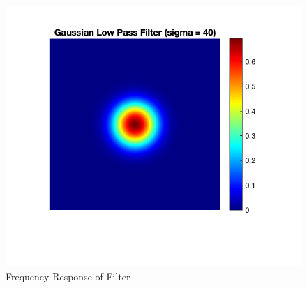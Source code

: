 \documentclass[12pt]{article}
\begin{document}
\begin{figure}[H]
    \centering
    \includegraphics{../images/gaussian_LPF_40.png}
    \caption{Frequency Response of Filter}
\end{figure}
\end{document}
